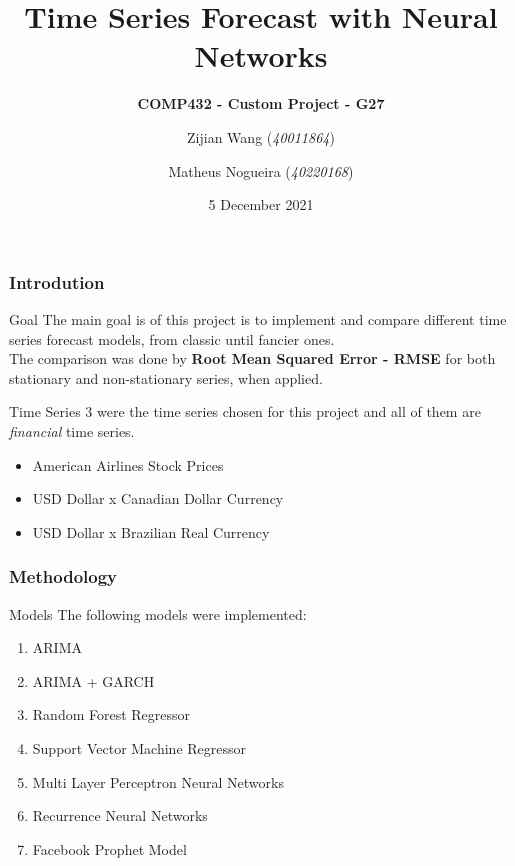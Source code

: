 \documentclass{beamer}
\title{Time Series Forecast with Neural Networks}
\subtitle{\textbf{COMP432 - Custom Project - G27}}
\author{Zijian Wang (\textit{40011864}) \and Matheus Nogueira (\textit{40220168})}
\date{5 December 2021}
\institute{\textbf{Concordia University}}
\begin{document}
	
	\frame{\titlepage}
		
	\begin{frame}
		\frametitle{Introdution}
		\begin{block}{Goal}
			The main goal is of this project is to implement and compare different time series forecast models, from classic until fancier ones.\\
			
			The comparison was done by \textbf{Root Mean Squared Error - RMSE} for both stationary and non-stationary series, when applied.
		\end{block}\pause
		\begin{block}{Time Series}
			3 were the time series chosen for this project and all of them are \textit{financial} time series.\pause
			\begin{itemize}
				\item American Airlines Stock Prices
				\item USD Dollar x Canadian Dollar Currency
				\item USD Dollar x Brazilian Real Currency
			\end{itemize}
		\end{block}
	\end{frame}
		
	\begin{frame}
		\frametitle{Methodology}
		\begin{block}{Models}
			The following models were implemented:\pause
			\begin{enumerate}
				\item ARIMA
				\item ARIMA + GARCH
				\item Random Forest Regressor
				\item Support Vector Machine Regressor
				\item Multi Layer Perceptron Neural Networks
				\item Recurrence Neural Networks
				\item Facebook Prophet Model
			\end{enumerate}
		\end{block}
	\end{frame}
	
\end{document}
